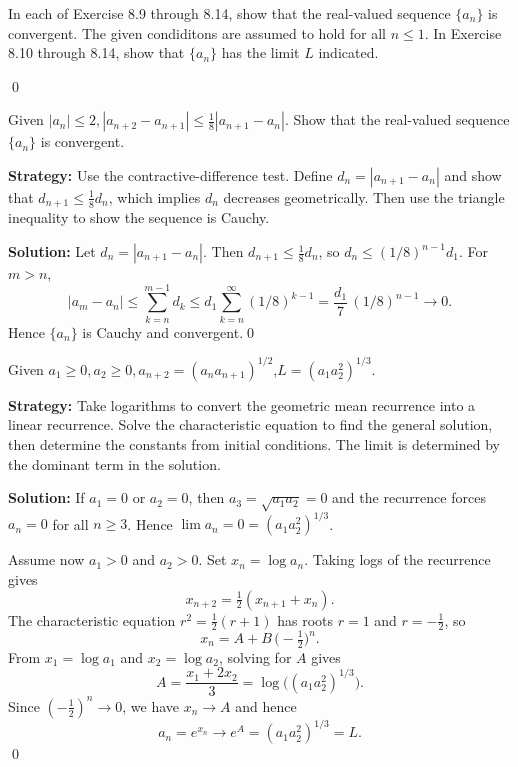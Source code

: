 \begin{tcolorbox}[colback=red!10,colframe=red!50,arc=3pt,boxrule=1pt]
In each of Exercise 8.9 through 8.14, show that the real-valued sequence $\{a_n\}$ is convergent. The given condiditons are assumed to hold for all $n\leq 1$. In Exercise 8.10 through 8.14, show that $\{a_n\}$ has the limit $L$ indicated.
\end{tcolorbox}\qed


\begin{problembox}
\begin{problemstatement}
Given \(|a_n| \leq 2, |a_{n+2} - a_{n+1}| \leq \frac{1}{8} |a_{n+1} - a_n|\). Show that the real-valued sequence \(\{a_n\}\) is convergent.
\end{problemstatement}
\end{problembox}

\noindent\textbf{Strategy:} Use the contractive-difference test. Define \(d_n=|a_{n+1}-a_n|\) and show that \(d_{n+1}\le \frac{1}{8}d_n\), which implies \(d_n\) decreases geometrically. Then use the triangle inequality to show the sequence is Cauchy.

\bigskip\noindent\textbf{Solution:}
Let \(d_n=|a_{n+1}-a_n|\). Then \(d_{n+1}\le \tfrac{1}{8}d_n\), so \(d_n\le (1/8)^{n-1} d_1\). For \(m>n\),
\[|a_m-a_n|\le \sum_{k=n}^{m-1} d_k \le d_1\sum_{k=n}^{\infty} (1/8)^{k-1}=\frac{d_1}{7}\,(1/8)^{n-1}\to 0.\]
Hence \(\{a_n\}\) is Cauchy and convergent.\qed


\begin{problembox}
\begin{problemstatement}
Given \(a_1 \geq 0, a_2 \geq 0, a_{n+2} = (a_n a_{n+1})^{1/2}\),\(L = (a_1 a_2^2)^{1/3}\).
\end{problemstatement}
\end{problembox}

\noindent\textbf{Strategy:} Take logarithms to convert the geometric mean recurrence into a linear recurrence. Solve the characteristic equation to find the general solution, then determine the constants from initial conditions. The limit is determined by the dominant term in the solution.

\bigskip\noindent\textbf{Solution:}
If \(a_1=0\) or \(a_2=0\), then \(a_3=\sqrt{a_1 a_2}=0\) and the recurrence forces \(a_n=0\) for all \(n\ge 3\). Hence \(\lim a_n=0=(a_1 a_2^2)^{1/3}\).

Assume now \(a_1>0\) and \(a_2>0\). Set \(x_n=\log a_n\). Taking logs of the recurrence gives
\[x_{n+2}=\tfrac{1}{2}(x_{n+1}+x_n).\]
The characteristic equation \(r^2=\tfrac{1}{2}(r+1)\) has roots \(r=1\) and \(r=-\tfrac{1}{2}\), so
\[x_n=A+B\,\big(-\tfrac{1}{2}\big)^{n}.\]
From \(x_1=\log a_1\) and \(x_2=\log a_2\), solving for \(A\) gives
\[A=\frac{x_1+2x_2}{3}=\log\big((a_1 a_2^2)^{1/3}\big).\]
Since \(({-}\tfrac{1}{2})^{n}\to 0\), we have \(x_n\to A\) and hence
\[a_n=e^{x_n}\longrightarrow e^{A}=(a_1 a_2^2)^{1/3}=L.\]\qed


